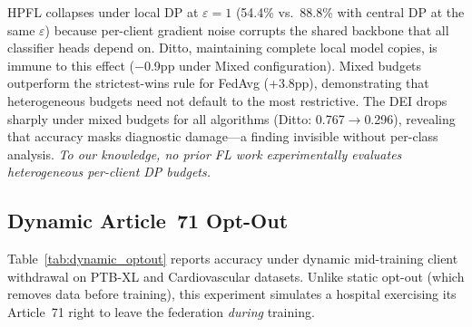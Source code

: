 \documentclass[conference]{IEEEtran}
\begin{document}
\begin{table}[htbp]
\centering
\caption{Cross-border heterogeneous DP on PTB-XL (5 clients, 5-class ECG). Per-client local DP with Gaussian mechanism, $C{=}1.0$, $\delta{=}10^{-5}$. Mean $\pm$ std over 3 seeds.}
\label{tab:crossborder_dp}

\vspace{1mm}
\footnotesize{HPFL collapses under local DP at $\varepsilon{=}1$ (54.4\% vs.\ 88.8\% with central DP at the same $\varepsilon$) because per-client gradient noise corrupts the shared backbone that all classifier heads depend on. Ditto, maintaining complete local model copies, is immune to this effect ($-$0.9pp under Mixed configuration). Mixed budgets outperform the strictest-wins rule for FedAvg (+3.8pp), demonstrating that heterogeneous budgets need not default to the most restrictive. The DEI drops sharply under mixed budgets for all algorithms (Ditto: 0.767$\to$0.296), revealing that accuracy masks diagnostic damage---a finding invisible without per-class analysis. \textit{To our knowledge, no prior FL work experimentally evaluates heterogeneous per-client DP budgets.}}
\end{table}

\subsection{Dynamic Article~71 Opt-Out}
\label{sec:dynamic_optout}

Table~\ref{tab:dynamic_optout} reports accuracy under dynamic mid-training client withdrawal on PTB-XL and Cardiovascular datasets. Unlike static opt-out (which removes data before training), this experiment simulates a hospital exercising its Article~71 right to leave the federation \textit{during} training.
\end{document}
